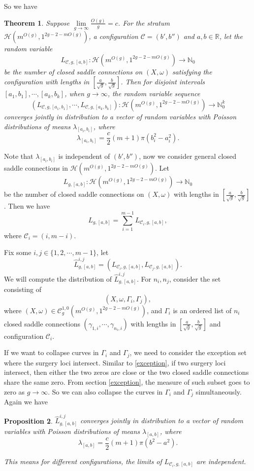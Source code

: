 \documentclass[12pt]{amsart} %
\newtheorem{theorem}{Theorem}[section]
\newtheorem{proposition}[theorem]{Proposition}
\theoremstyle{definition}
\theoremstyle{remark}
\numberwithin{equation}{section}
\renewcommand\H{{\mathcal H}}
\begin{document}
So we have
\begin{theorem}
Suppose $\lim\limits_{g\to \infty}\frac{O(g)}{g}=c$. 
For the stratum $\H(m^{O(g)},1^{2g-2-mO(g)})$, a configuration $\mathcal{C}=(b',b'')$ and $a,b\in \mathbb{R}$,
let the random variable
$$L_{\mathcal{C},g,[a,b]}:\H(m^{O(g)},1^{2g-2-mO(g)}) \to \mathbb{N}_0$$ 
be the number of closed saddle connections on $(X,\omega)$ satisfying the configuration with lengths in $[\frac{a}{\sqrt{g}},\frac{b}{\sqrt{g}}]$.
Then for disjoint intervals $[a_1,b_1],\cdots,[a_k,b_k]$, when $g\to \infty$, the random variable sequence
$$(L_{\mathcal{C},g,[a_1,b_1]},\cdots,L_{\mathcal{C},g,[a_k,b_k]}):\H(m^{O(g)},1^{2g-2-mO(g)}) \to \mathbb{N}^k_0$$
converges jointly in distribution to a vector of random variables with Poisson distributions of means $\lambda_{[a_i,b_i]}$, where
$$\lambda_{[a_i,b_i]}=\frac{c}{2}(m+1)\pi(b_i^2-a_i^2).$$

\end{theorem}

Note that $\lambda_{[a_i,b_i]}$ is independent of $(b',b'')$,
now we consider general closed saddle connections in $\H(m^{O(g)},1^{2g-2-mO(g)})$.
Let 
$$L_{g,[a,b]}:\H(m^{O(g)},1^{2g-2-mO(g)}) \to \mathbb{N}_0$$
be the number of closed saddle connections on $(X,\omega)$ with lengths in $[\frac{a}{\sqrt{g}},\frac{b}{\sqrt{g}}]$.
Then we have 
$$L_{g,[a,b]}=\sum_{i=1}^{m-1}L_{\mathcal{C}_i,g,[a,b]},$$
where $\mathcal{C}_i=(i,m-i)$. 

Fix some $i,j\in \{1,2,\cdots,m-1\}$,
let
$$\hat{L}^{i,j}_{g,[a,b]}=(L_{\mathcal{C}_i,g,[a,b]},L_{\mathcal{C}_j,g,[a,b]}).$$
We will compute the distribution of $\hat{L}^{i,j}_{g,[a,b]}$.
For $n_i,n_j$, consider the set consisting of 
$$(X,\omega,\Gamma_i,\Gamma_j),$$
where $(X,\omega)\in \mathcal{C}^{1,0}_{g}(m^{O(g)},1^{2g-2-mO(g)})$, 
and $\Gamma_i$ is an ordered list of $n_i$ closed saddle connections $(\gamma_{1,i},\cdots,\gamma_{n_i,i})$ 
with lengths in $[\frac{a}{\sqrt{g}},\frac{b}{\sqrt{g}}]$ and configuration $\mathcal{C}_i$. 


If we want to collapse curves in $\Gamma_i$ and $\Gamma_j$, we need to consider the exception set where the surgery loci intersect.
Similar to \ref{exception}, if two surgery loci intersect, then either the two zeros are close or the two closed saddle connections share
the same zero.
From section \ref{exception}, the measure of such subset goes to zero as $g\to \infty$.
So we can also collapse the curves in $\Gamma_i$ and $\Gamma_j$ simultaneously.
Again we have
\begin{proposition}
$\hat{L}^{i,j}_{g,[a,b]}$ converges jointly in distribution to a vector of random variables with Poisson distributions of means $\lambda_{[a,b]}$, where
$$\lambda_{[a,b]}=\frac{c}{2}(m+1)\pi(b^2-a^2).$$

This means for different configurations, the limits of $L_{\mathcal{C}_i,g,[a,b]}$ are independent.
\end{proposition}
\end{document}
